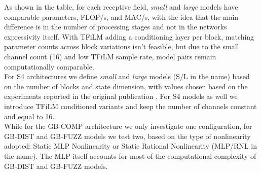 As shown in the table, for each receptive field, \textit{small} and \textit{large} models have comparable parameters, FLOP/s, and MAC/s, with the idea that the main difference is in the number of processing stages and not in the networks expressivity itself.
With TFiLM adding a conditioning layer per block, matching parameter counts across block variations isn't feasible, but due to the small channel count (16) and low TFiLM sample rate, model pairs remain computationally comparable.\\
For S4 architectures we define \textit{small} and \textit{large} models (S/L in the name) based on the number of blocks and state dimension, with values chosen based on the experiments reported in the original publication \citep{gu2021efficiently}.
For S4 models as well we introduce TFiLM conditioned variants and keep the number of channels constant and equal to 16.\\
While for the GB-COMP architecture we only investigate one configuration, for GB-DIST and GB-FUZZ models we test two, based on the type of nonlinearity adopted: Static MLP Nonlinearity or Static Rational Nonlinearity (MLP/RNL in the name).
The MLP itself accounts for most of the computational complexity of GB-DIST and GB-FUZZ models.\\

